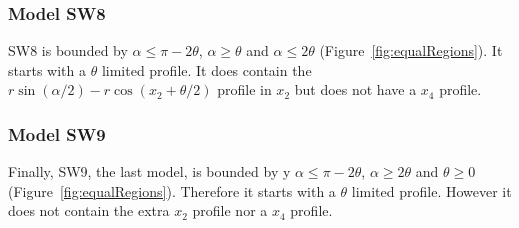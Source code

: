 \subsubsection{Model SW8} \label{SW8}

SW8 is bounded by $\alpha \le \pi - 2\theta$, $\alpha \ge \theta$ and $\alpha \le 2\theta$ (Figure~\ref{fig:equalRegions}).
It starts with a $\theta$ limited profile.
It does contain the $r\sin(\alpha/2) - r\cos(x_2 + \theta/2)$ profile in $x_2$ but does not have a $x_4$ profile.

\subsubsection{Model SW9} \label{SW9}

Finally, SW9, the last model, is bounded by y $\alpha \le \pi - 2\theta$, $\alpha \ge 2\theta$ and $\theta \ge 0$ (Figure~\ref{fig:equalRegions}).
Therefore it starts with a $\theta$ limited profile.
However it does not contain the extra $x_2$ profile nor a $x_4$ profile.








